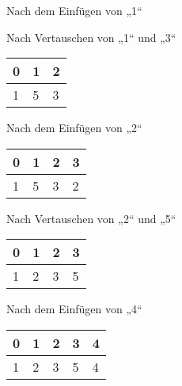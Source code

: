 \documentclass{bschlangaul-aufgabe}
\begin{document}
\begin{enumerate}
\begin{enumerate}
\begin{liDiagramm}{Nach dem Einfügen von „1“}
\end{liDiagramm}

\begin{liDiagramm}{Nach Vertauschen von „1“ und „3“}
\begin{tabular}{lll}
\bf{0} & \bf{1} & \bf{2} \\
\hline
1      & 5      & 3      \\
\end{tabular}

\end{liDiagramm}

\begin{liDiagramm}{Nach dem Einfügen von „2“}
\begin{tabular}{llll}
\bf{0} & \bf{1} & \bf{2} & \bf{3} \\
\hline
1      & 5      & 3      & 2      \\
\end{tabular}

\end{liDiagramm}

\begin{liDiagramm}{Nach Vertauschen von „2“ und „5“}
\begin{tabular}{llll}
\bf{0} & \bf{1} & \bf{2} & \bf{3} \\
\hline
1      & 2      & 3      & 5      \\
\end{tabular}

\end{liDiagramm}

\begin{liDiagramm}{Nach dem Einfügen von „4“}
\begin{tabular}{lllll}
\bf{0} & \bf{1} & \bf{2} & \bf{3} & \bf{4} \\
\hline
1      & 2      & 3      & 5      & 4      \\
\end{tabular}


\end{liDiagramm}
\end{enumerate}
\end{enumerate}
\end{document}
